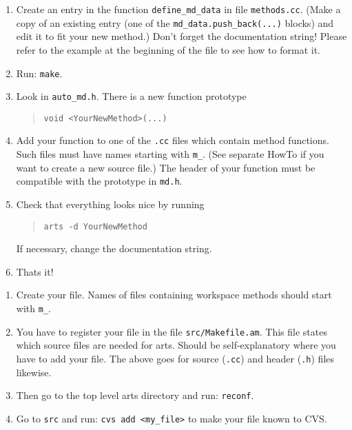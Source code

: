 \begin{enumerate}
\item Create an entry in the function \verb|define_md_data| in file
  \verb|methods.cc|.  (Make a copy of an existing entry (one of the
  \verb|md_data.push_back(...)| blocks) and edit it to fit your new
  method.) Don't forget the documentation string! Please refer to the
  example at the beginning of the file to see how to format it.
\item Run:
  \verb|make|.
\item Look in \verb|auto_md.h|. There is a new function prototype
  \begin{quote}
    \verb|void <YourNewMethod>(...)|
  \end{quote}
\item Add your function to one of the \verb|.cc| files which contain method
  functions. Such files must have names starting with \verb|m_|. (See
  separate HowTo if you want to create a new source file.) The header
  of your function must be compatible with the prototype in \verb|md.h|.
\item Check that everything looks nice by running 
  \begin{quote}
    \verb|arts -d YourNewMethod|
  \end{quote}
  If necessary, change the documentation string.

\item Thats it!
\end{enumerate}


\begin{enumerate}
\item Create your file. Names of files containing workspace methods should
  start with \verb|m_|.
\item You have to register your file in the file \verb|src/Makefile.am|.
  This file states which source files are needed for arts. Should be
  self-explanatory where you have to add your file. The above goes for
  source (\verb|.cc|) and header (\verb|.h|) files likewise.
\item Then go to the top level arts directory and run: \verb|reconf|.
\item Go to \verb|src| and run: \verb|cvs add <my_file>| to make your
  file known to CVS.
\end{enumerate}


